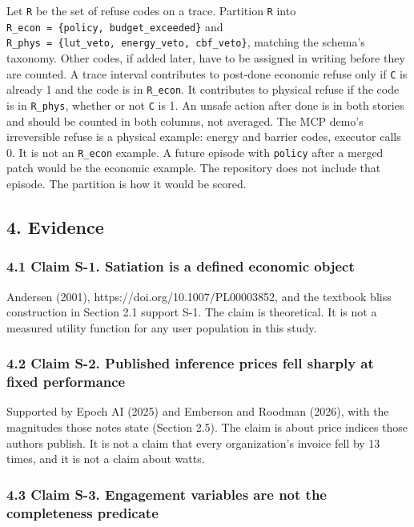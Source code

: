 \documentclass[
  10pt,
]{article}
\begin{document}
Let \texttt{R} be the set of refuse codes on a trace. Partition
\texttt{R} into \texttt{R\_econ\ =\ \{policy,\ budget\_exceeded\}} and
\texttt{R\_phys\ =\ \{lut\_veto,\ energy\_veto,\ cbf\_veto\}}, matching
the schema's taxonomy. Other codes, if added later, have to be assigned
in writing before they are counted. A trace interval contributes to
post-done economic refuse only if \texttt{C} is already 1 and the code
is in \texttt{R\_econ}. It contributes to physical refuse if the code is
in \texttt{R\_phys}, whether or not \texttt{C} is 1. An unsafe action
after done is in both stories and should be counted in both columns, not
averaged. The MCP demo's irreversible refuse is a physical example:
energy and barrier codes, executor calls 0. It is not an
\texttt{R\_econ} example. A future episode with \texttt{policy} after a
merged patch would be the economic example. The repository does not
include that episode. The partition is how it would be scored.

\subsection{4. Evidence}\label{evidence}

\subsubsection{4.1 Claim S-1. Satiation is a defined economic
object}\label{claim-s-1.-satiation-is-a-defined-economic-object}

Andersen (2001), https://doi.org/10.1007/PL00003852, and the textbook
bliss construction in Section 2.1 support S-1. The claim is theoretical.
It is not a measured utility function for any user population in this
study.

\subsubsection{4.2 Claim S-2. Published inference prices fell sharply at
fixed
performance}\label{claim-s-2.-published-inference-prices-fell-sharply-at-fixed-performance}

Supported by Epoch AI (2025) and Emberson and Roodman (2026), with the
magnitudes those notes state (Section 2.5). The claim is about price
indices those authors publish. It is not a claim that every
organization's invoice fell by 13 times, and it is not a claim about
watts.

\subsubsection{4.3 Claim S-3. Engagement variables are not the
completeness
predicate}\label{claim-s-3.-engagement-variables-are-not-the-completeness-predicate}
\end{document}
